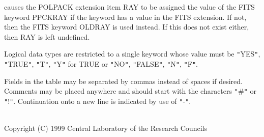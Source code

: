 \documentclass[twoside,11pt]{article}
\renewcommand{\_}{\texttt{\symbol{95}}}
\newcommand{\sstdiytopic}[2]{\item[{\hspace{-0.35em}#1\hspace{-0.35em}:}]
\mbox{} \\[1.3ex] #2}
\newcommand{\sstdiytopic}[2]{\item[{#1}] #2 }
\begin{document}
{{      causes the POLPACK extension item RAY to be assigned the value of the
      FITS keyword PPCKRAY if the keyword has a value in the FITS
      extension. If not, then the FITS keyword OLDRAY is used instead. If
      this does not exist either, then RAY is left undefined.

      Logical data types are restricted to a single keyword whose value
      must be {\tt "}YES{\tt "}, {\tt "}TRUE{\tt "}, {\tt "}T{\tt "}, {\tt "}Y{\tt "} for TRUE or {\tt "}NO{\tt "}, {\tt "}FALSE{\tt "}, {\tt "}N{\tt "},
      {\tt "}F{\tt "}.

      Fields in the table may be separated by commas instead of spaces if 
      desired. Comments may be placed anywhere and should start with the 
      characters {\tt "}\#{\tt "} or {\tt "}!{\tt "}. Continuation onto 
      a new line is indicated by use of {\tt "}-{\tt "}.
   }
   \sstdiytopic{
      Copyright
   }{
      Copyright (C) 1999 Central Laboratory of the Research Councils
   }
}
\end{document}
